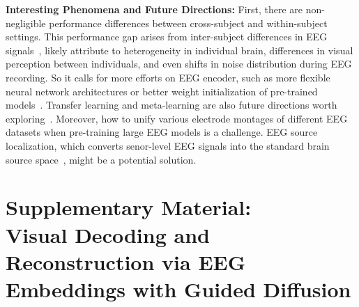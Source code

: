 \documentclass{article}
\begin{document}
\textbf{Interesting Phenomena and Future Directions:} First, there are non-negligible performance differences between cross-subject and within-subject settings. This performance gap arises from inter-subject differences in EEG signals~\cite{gibson2022eeg,xu2020cross}, likely attribute to heterogeneity in individual brain, differences in visual perception between individuals, and even shifts in noise distribution during EEG recording. So it calls for more efforts on EEG encoder, such as more flexible neural network architectures or better weight initialization of pre-trained models~\cite{cui2023neuro,chen2024toward}. Transfer learning and meta-learning are also future directions worth exploring~\cite{wu2020transfer,wu2022transfer,xie2023cross}. Moreover, how to unify various electrode montages of different EEG datasets when pre-training large EEG models is a challenge. EEG source localization, which converts senor-level EEG signals into the standard brain source space~\cite{wei2021edge,wang2024advancing}, might be a potential solution. 




\medskip


{
\small
% 
% 


}




\newpage
\vspace{7pt}
\section*{\Large \centering Supplementary Material: \\ 
\vspace{7pt}
{Visual Decoding and Reconstruction via EEG Embeddings with Guided Diffusion}}

\appendix


    
\end{document}
